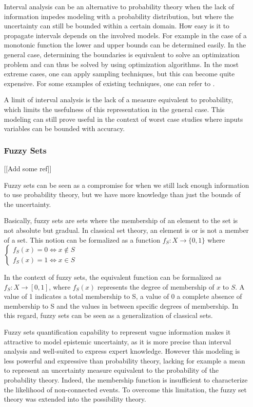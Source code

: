 Interval analysis can be an alternative to probability theory when the lack of information impedes modeling with a probability distribution, but where the uncertainty can still be bounded within a certain domain.
How easy is it to propagate intervals depends on the involved models. For example in the case of a monotonic function the lower and upper bounds can be determined easily. In the general case, determining the boundaries is equivalent to solve an optimization problem and can thus be solved by using optimization algorithms. In the most extreme cases, one can apply sampling techniques, but this can become quite expensive.
For some examples of existing techniques, one can refer to \cite{Kreinovich_2008}.

A limit of interval analysis is the lack of a measure equivalent to probability, which limits the usefulness of this representation in the general case. This modeling can still prove useful in the context of worst case studies where inputs variables can be bounded with accuracy.

\subsubsection{Fuzzy Sets}

[[Add some ref]]

Fuzzy sets can be seen as a compromise for when we still lack enough information to use probability theory, but we have more knowledge than just the bounds of the uncertainty.

Basically, fuzzy sets are sets where the membership of an element to the set is not absolute but gradual.
In classical set theory, an element is or is not a member of a set. This notion can be formalized as a function $f_S: X \rightarrow \{0,1\}$ where 
$\left\{
 		 \begin{array}{rcr}
			f_S(x) = 0 \Leftrightarrow x \not\in S\\
			f_S(x) = 1 \Leftrightarrow x \in S
		\end{array}
	\right. $

In the context of fuzzy sets, the equivalent function can be formalized as $f_S: X \rightarrow [0, 1]$, where $f_S(x)$ represents the degree of membership of $x$ to $S$. A value of 1 indicates a total membership to S, a value of 0 a complete absence of membership to S and the values in between specific degrees of membership.
In this regard, fuzzy sets can be seen as a generalization of classical sets.

Fuzzy sets quantification capability to represent vague information makes it attractive to model epistemic uncertainty, as it is more precise than interval analysis and well-suited to express expert knowledge. However this modeling is less powerful and expressive than probability theory, lacking for example a mean to represent an uncertainty measure equivalent to the probability of the probability theory. Indeed, the membership function is insufficient to characterize the likelihood of non-connected events.
To overcome this limitation, the fuzzy set theory was extended into the possibility theory.

